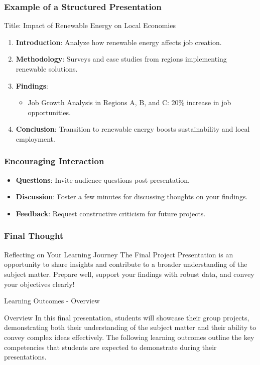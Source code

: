 \documentclass[aspectratio=169]{beamer}
\begin{document}
\begin{frame}[fragile]
    \frametitle{Example of a Structured Presentation}
    \begin{block}{Title: Impact of Renewable Energy on Local Economies}
        \begin{enumerate}
            \item \textbf{Introduction}: Analyze how renewable energy affects job creation.
            \item \textbf{Methodology}: Surveys and case studies from regions implementing renewable solutions.
            \item \textbf{Findings}: 
            \begin{itemize}
                \item Job Growth Analysis in Regions A, B, and C: 20\% increase in job opportunities.
            \end{itemize} 
            \item \textbf{Conclusion}: Transition to renewable energy boosts sustainability and local employment.
        \end{enumerate}
    \end{block}
\end{frame}

\begin{frame}[fragile]
    \frametitle{Encouraging Interaction}
    \begin{itemize}
        \item \textbf{Questions}: Invite audience questions post-presentation.
        \item \textbf{Discussion}: Foster a few minutes for discussing thoughts on your findings.
        \item \textbf{Feedback}: Request constructive criticism for future projects.
    \end{itemize}
\end{frame}

\begin{frame}[fragile]
    \frametitle{Final Thought}
    \begin{block}{Reflecting on Your Learning Journey}
        The Final Project Presentation is an opportunity to share insights and contribute 
        to a broader understanding of the subject matter. Prepare well, support your findings 
        with robust data, and convey your objectives clearly!
    \end{block}
\end{frame}

\begin{frame}[fragile]{Learning Outcomes - Overview}
    \begin{block}{Overview}
    In this final presentation, students will showcase their group projects, demonstrating both their understanding of the subject matter and their ability to convey complex ideas effectively. The following learning outcomes outline the key competencies that students are expected to demonstrate during their presentations.
    \end{block}
\end{frame}
\end{document}
